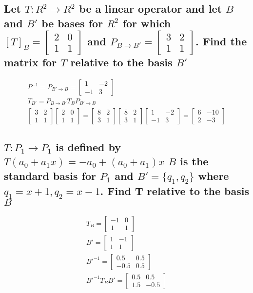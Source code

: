 \documentclass[12pt, a4paper]{article}
\begin{document}
		\subsection{Let $T:R^2\rightarrow R^2$ be a linear operator and let $B$ and $B'$ be bases for $R^2$ for which $[T]_B=\begin{bmatrix}2&0\\1&1\end{bmatrix}$ and $P_{B\rightarrow B'}=\begin{bmatrix}3&2\\1&1\end{bmatrix}$. Find the matrix for $T$ relative to the basis $B'$}
			\begin{align*}
				P^{-1}=P_{B'\rightarrow B} = \begin{bmatrix}1&-2\\-1&3\end{bmatrix}\\
				T_{B'}=P_{B\rightarrow B'}T_BP_{B'\rightarrow B}\\
				\begin{bmatrix}3&2\\1&1\end{bmatrix}\begin{bmatrix}2&0\\1&1\end{bmatrix}=\begin{bmatrix}8&2\\3&1\end{bmatrix}
				\begin{bmatrix}8&2\\3&1\end{bmatrix} \begin{bmatrix}1&-2\\-1&3\end{bmatrix}=\begin{bmatrix}6&-10\\2&-3\end{bmatrix}
			\end{align*}
		\subsection{$T:P_1\rightarrow P_1$ is defined by $T(a_0+a_1x)=-a_0+(a_0+a_1)x$ $B$ is the standard basis for $P_1$ and $B'=\{q_1,q_2\}$ where $q_1=x+1, q_2=x-1$. Find T relative to the basis $B$}
			\begin{align*}
				T_B=\begin{bmatrix}-1&0\\1&1\end{bmatrix}\\
				B'=\begin{bmatrix}1&-1\\1 & 1\end{bmatrix}\\
				B'^{-1}=\begin{bmatrix}0.5&0.5\\-0.5&0.5\end{bmatrix}\\
				B'^{-1}T_BB'=\begin{bmatrix}0.5&0.5\\1.5&-0.5\end{bmatrix}
			\end{align*}
\end{document}
